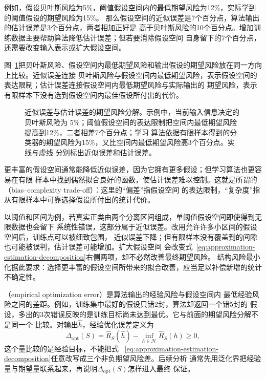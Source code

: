 例如，假设贝叶斯风险为5\%，阈值假设空间内的最低期望风险为12\%，实际学到的阈值假设的期望风险为15\%。
那么假设空间的近似误差是7个百分点，算法输出的估计误差是3个百分点，两者相加正好是
高于贝叶斯风险的10个百分点。增加训练数据主要帮助算法降低估计误差；但若要消除假设空间
自身留下的7个百分点，还需要改变输入表示或扩大假设空间。

图~\ref{fig:approximation-estimation-error}把贝叶斯风险、假设空间内最低期望风险和输出假设的期望风险放在同一方向上比较。近似误差连接
贝叶斯风险与假设空间内最低期望风险，表示假设空间的表达限制；估计误差连接假设空间内最低期望风险与实际输出的
期望风险，表示有限样本下没有选到假设空间内最佳假设所付出的代价。

\begin{figure}[htbp]
  \centering
  
  \caption{近似误差与估计误差的期望风险分解。示例中，当前输入信息决定的贝叶斯风险为
  5\%；阈值假设空间的表达限制把空间内最低期望风险提高到12\%，二者相差7个百分点；学习
  算法依据有限样本得到的分类器的期望风险为15\%，又比空间内最低期望风险高3个百分点。实线与虚线
  分别标出近似误差和估计误差。}
  \label{fig:approximation-estimation-error}
\end{figure}

更丰富的假设空间通常能降低近似误差，因为它拥有更多假设；但学习算法也更容易在有限
样本中找到偶然拟合良好的函数，使估计误差难以控制。这就是所谓的
（bias--complexity trade-off）：这里的“偏差”指假设空间
的表达限制，“复杂度”指从有限样本中可靠选择假设所付出的统计代价。

以阈值和区间为例，若真实正类由两个分离区间组成，单阈值假设空间即使得到无限数据也会留下
系统性错误，这部分属于近似误差。改用允许许多小区间的假设空间后，训练点可以被细致包围，
近似误差下降；但有限样本没有覆盖到的间隙也可能被误判，估计误差可能增加。扩大假设空间
会改变式~\eqref{eq:approximation-estimation-decomposition}右侧两项，却不必然改善最终期望风险。
结构风险最小化据此要求：选择更丰富的假设空间所带来的拟合改善，应当足以补偿新增的统计不确定性。

（empirical optimization error）是算法输出的经验风险与假设空间内
最低经验风险之间的差距。例如，训练集中最好的假设只错2封，算法却返回一个错5封的
假设，多出的3次错误反映的是训练目标尚未达到最优。它与前面的期望风险分解不是同一个
比较。对输出$\hat h$，经验优化误差定义为
\begin{equation}
  \Delta_{\mathrm{opt}}(S)
  =\hat R_S(\hat h)-\inf_{h\in\mathcal H}\hat R_S(h)
  \geq0,
  \label{eq:empirical-optimization-error}
\end{equation}
这个量比较的是经验目标，不能把式
~\eqref{eq:approximation-estimation-decomposition}任意改写成三个非负期望风险差。后续分析
通常先用泛化界把经验量与期望量联系起来，再说明$\Delta_{\mathrm{opt}}(S)$怎样进入最终
保证。


